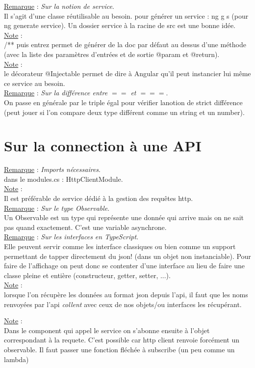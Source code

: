 \documentclass[a4paper,12pt,twoside]{article}
\newcommand{\incode}[1]{{\footnotesize\ttfamily #1}} %
\newcommand{\rem}[2]{\noindent\underline{Remarque} : \textit{#1}.\\ \indent #2}
\newcommand{\note}[1]{\noindent\underline{Note} : \\ \indent #1}
\begin{document}
\rem{Sur la notion de service}{Il s'agit d'une classe réutilisable au besoin. pour générer un service : \incode{ng g s} (pour \incode{ng generate service}). Un dossier service à la racine de \incode{src} est une bonne idée.}\\

\note{/** puis entrez permet de générer de la doc par défaut au dessus d'une méthode (avec la liste des paramètres d'entrées et de sortie @param et @return).}\\

\note{le décorateur \incode{@Injectable} permet de dire à Angular qu'il peut instancier lui même ce service au besoin.}\\

\rem{Sur la différence entre $==$ et $===$}{On passe en générale par le triple égal pour vérifier lanotion de strict différence (peut jouer si l'on compare deux type différent comme un \incode{string} et un \incode{number}).}

\section{Sur la connection à une API}

\rem{Imports nécessaires}{dans le modules.cs : HttpClientModule.}\\

\note{Il est préférable de service dédié à la gestion des requêtes http.}\\

\rem{Sur le type Observable}{Un Observable est un type qui représente une donnée qui arrive mais on ne sait pas quand exactement. C'est une variable asynchrone.}\\

\rem{Sur les interfaces en TypeScript}{Elle peuvent servir comme les interface classiques ou bien comme un support permettant de tapper directement du json! (dans un objet non instanciable). Pour faire de l'affichage on peut donc se contenter d'une interface au lieu de faire une classe pleine et entière (constructeur, getter, setter, ...).}\\

\note{lorsque l'on récupère les données au format json depuis l'api, il faut que les noms renvoyées par l'api \textit{collent} avec ceux de nos objets/ou interfaces les récupérant.}

\note{Dans le component qui appel le service on s'abonne ensuite à l'objet correspondant à la requete. C'est possible car http client renvoie forcément un observable. Il faut passer une fonction fléchée à subscribe (un peu comme un lambda)}\\
\end{document}
